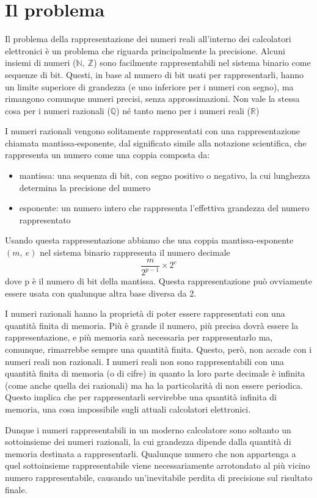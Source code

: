 \documentclass[Lau]{sapthesis}
\begin{document}
\section{Il problema}
Il problema della rappresentazione dei numeri reali all'interno dei calcolatori elettronici è un problema che riguarda principalmente la precisione. Alcuni insiemi di numeri ($\mathbb{N},\ \mathbb{Z}$) sono 
facilmente rappresentabili nel sistema binario come sequenze di bit. Questi, in 
base al numero di bit usati per rappresentarli, hanno un limite superiore di 
grandezza (e uno inferiore per i numeri con segno), ma rimangono comunque numeri 
precisi, senza approssimazioni. Non vale la stessa cosa per i numeri razionali 
($\mathbb{Q}$) né tanto meno per i numeri reali ($\mathbb{R}$)

I numeri razionali vengono solitamente rappresentati con una rappresentazione 
chiamata mantissa-esponente, dal significato simile alla notazione 
scientifica, che rappresenta un numero come una coppia composta da:
\begin{itemize}
	\item mantissa: una sequenza di bit, con segno positivo o negativo, la cui 
lunghezza determina la precisione del numero
	\item esponente: un numero intero che rappresenta l'effettiva grandezza del 
numero rappresentato
\end{itemize}
Usando questa rappresentazione abbiamo che una coppia mantissa-esponente $\left(m,\ e\right)$ nel sistema binario rappresenta il numero decimale
$$\frac{m}{2^{p-1}} \times 2^e$$
dove p è il numero di bit della mantissa. Questa rappresentazione può ovviamente essere usata con qualunque altra base 
diversa da 2.

\medskip

I numeri razionali hanno la proprietà di poter essere rappresentati con una 
quantità finita di memoria. Più è grande il numero, più precisa dovrà essere la 
rappresentazione, e più memoria sarà necessaria per rappresentarlo ma, comunque, 
rimarrebbe sempre una quantità finita. Questo, però, non accade con i numeri 
reali non razionali. I numeri reali non sono rappresentabili con una quantità 
finita di memoria (o di cifre) in quanto la loro parte decimale è infinita (come 
anche quella dei razionali) ma ha la particolarità di non essere periodica. 
Questo implica che per rappresentarli servirebbe una quantità infinita di 
memoria, una cosa impossibile sugli attuali calcolatori elettronici.

Dunque i numeri rappresentabili in un moderno calcolatore sono soltanto un 
sottoinsieme dei numeri razionali, la cui grandezza dipende dalla quantità di 
memoria destinata a rappresentarli. Qualunque numero che non appartenga a quel 
sottoinsieme rappresentabile viene necessariamente arrotondato al più vicino 
numero rappresentabile, causando un'inevitabile perdita di precisione sul 
risultato finale.
\end{document}
